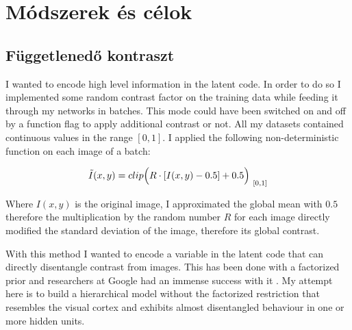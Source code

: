 \documentclass[12pt, english]{article}
\begin{document}
\newpage

\section{Módszerek és célok}

\vspace{7mm}

\subsection{Függetlenedő kontraszt}

\vspace{5mm}

\par I wanted to encode high level information in the latent code. In order to do so I implemented some random contrast factor on the training data while feeding it through my networks in batches. This mode could have been switched on and off by a function flag to apply additional contrast or not. All my datasets contained continuous values in the range $[0, 1]$. I applied the following non-deterministic function on each image of a batch:

\vspace{4mm}

\begin{equation}
    \Tilde{I}(x, y) = clip\Big(R \cdot [I(x, y) - 0.5] + 0.5\Big)_{\ [0, 1]}
\end{equation}

\vspace{4mm}

\par Where $I(x, y)$ is the original image, I approximated the global mean with $0.5$ therefore the multiplication by the random number $R$ for each image directly modified the standard deviation of the image, therefore its global contrast.

\vspace{4mm}

\par With this method I wanted to encode a variable in the latent code that can directly disentangle contrast from images. This has been done with a factorized prior and researchers at Google had an immense success with it \cite{DBLP:journals/corr/abs-1811-12359}. My attempt here is to build a hierarchical model without the factorized restriction that resembles the visual cortex and exhibits almost disentangled behaviour in one or more hidden units.

\vspace{5mm}
\end{document}
